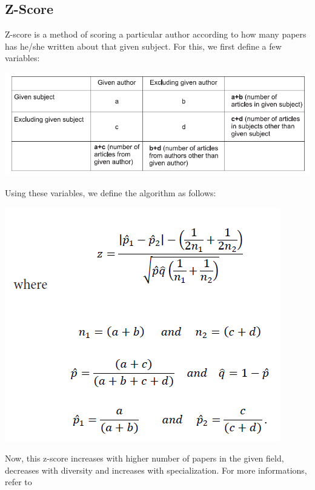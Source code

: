 \documentclass[paper=a4, fontsize=11pt]{scrartcl}
\numberwithin{equation}{section}		%
\numberwithin{figure}{section}			%
\numberwithin{table}{section}				%
\begin{document}
\subsection{Z-Score}
Z-score is a method of scoring a particular author according to how many papers has he/she written about that given subject.
For this, we first define a few variables:
\begin{center}
\includegraphics[scale=0.75]{zscorematrix}
\end{center}
Using these variables, we define the algorithm as follows: 
\begin{center}
\includegraphics[scale=0.85]{ascoreformula}
\end{center}
Now, this z-score increases with higher number of papers in the given field, decreases with diversity and increases with specialization. For more informations, refer to \cite{zscore}
\end{document}
